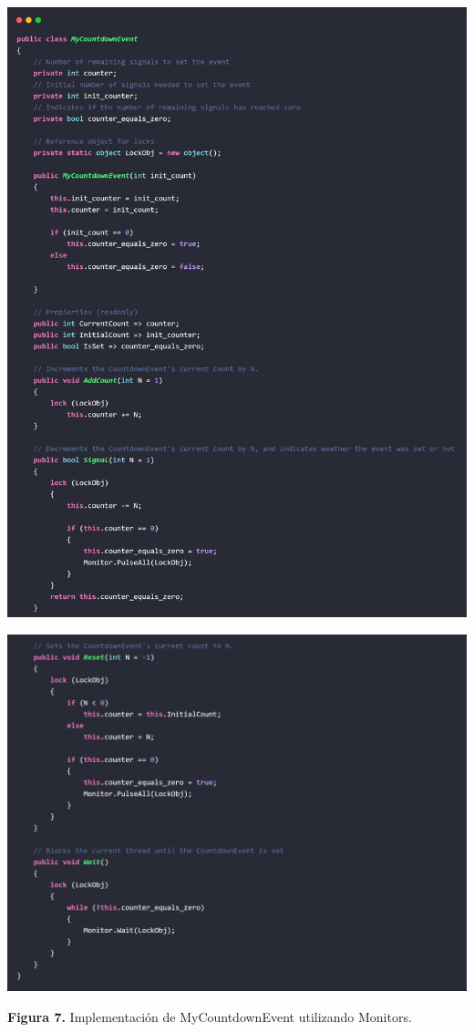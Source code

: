 \documentclass[10pt]{article} %
\newcommand{\imgcaption}[2]{\tiny \textbf{Figura #1.} #2.}
\begin{document}
\begin{center}
	\includegraphics[width=15cm]{MyCountdownEvent1.jpg}
\end{center}

\begin{center}
	\includegraphics[width=15cm]{MyCountdownEvent2.jpg}
	
	\imgcaption{7}{Implementaci\'on de MyCountdownEvent utilizando Monitors}
\end{center}
\end{document}
